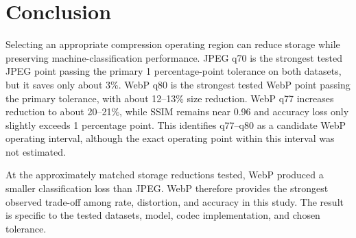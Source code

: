 \section{Conclusion}

Selecting an appropriate compression operating region can reduce storage while preserving machine-classification performance. JPEG q70 is the strongest tested JPEG point passing the primary 1 percentage-point tolerance on both datasets, but it saves only about 3\%. WebP q80 is the strongest tested WebP point passing the primary tolerance, with about 12--13\% size reduction. WebP q77 increases reduction to about 20--21\%, while SSIM remains near 0.96 and accuracy loss only slightly exceeds 1 percentage point. This identifies q77--q80 as a candidate WebP operating interval, although the exact operating point within this interval was not estimated.

At the approximately matched storage reductions tested, WebP produced a smaller classification loss than JPEG. WebP therefore provides the strongest observed trade-off among rate, distortion, and accuracy in this study. The result is specific to the tested datasets, model, codec implementation, and chosen tolerance.
